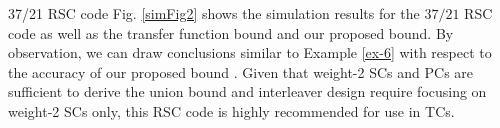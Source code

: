 \begin{example}{37/21 RSC code}
Fig. \ref{simFig2} shows the simulation results for the $37/21$ RSC code as well as  the transfer function bound and our proposed bound. By observation, we can draw conclusions similar to  Example \ref{ex-6} with respect to the accuracy of our proposed bound . Given that weight-2 SCs and PCs are sufficient to derive the union bound and interleaver design require focusing on weight-2 SCs only, this RSC code is highly recommended for use in TCs.

\label{ex-7}
\end{example}

